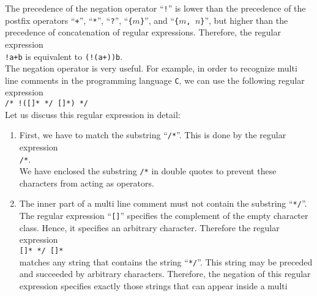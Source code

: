 \begin{enumerate}
      The precedence of the negation operator ``\texttt{!}'' is lower than the precedence of the
      postfix operators ``\texttt{+}'', ``\texttt{*}'', ``\texttt{?}'', ``\texttt{\{$m$\}}'', and
      ``\texttt{\{$m$, $n$\}}'', but higher than the precedence of concatenation of regular expressions.
      Therefore, the regular expression
      \\[0.2cm]
      \hspace*{1.3cm}
      \texttt{!a+b} \quad is equivalent to \quad
      \texttt{(!(a+))b}.
      \\[0.2cm]
      The negation operator is very useful.  For example, in order to recognize multi line comments
      in the programming language \texttt{C}, we can use the following regular expression
      \\[0.2cm]
      \hspace*{1.3cm}
      \texttt{/* !([]* */ []*) 
              */}
      \\[0.2cm]
      Let us discuss this regular expression in detail:
      \begin{enumerate}
      \item First, we have to match the substring  ``\texttt{/*}''.  This is done by the regular expression
            \\[0.2cm]
            \hspace*{1.3cm}
            \texttt{/*}.
            \\[0.2cm]
            We have enclosed the substring \texttt{/*} in double quotes to prevent these characters
            from acting as operators.
      \item The inner part of a multi line comment must not contain the substring ``\texttt{*/}''.
            The regular expression ``\texttt{[]}'' specifies the complement of the empty
            character class.  Hence, it specifies an arbitrary character. 
            Therefore the regular expression
            \\[0.2cm]
            \hspace*{1.3cm}
            \texttt{[]* */ []*}
            \\[0.2cm]
            matches any string that  contains the string ``\texttt{*/}''.  This string may be
            preceded and succeeded by arbitrary characters. Therefore, the negation of
            this regular expression specifies exactly those strings that can appear inside a multi

\end{enumerate}
\end{enumerate}
